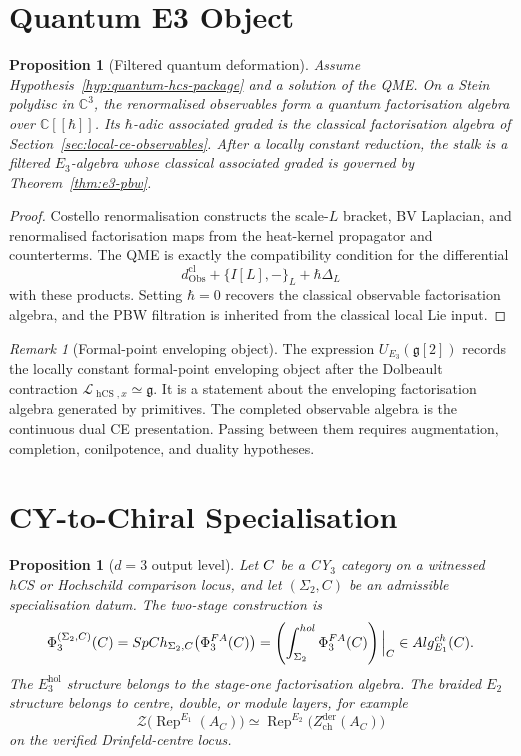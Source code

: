 \documentclass[11pt]{amsart}
\providecommand{\C}{\mathbb{C}}
\providecommand{\fg}{\mathfrak{g}}
\providecommand{\Rep}{\operatorname{Rep}}
\providecommand{\Obs}{\operatorname{Obs}}
\providecommand{\hCS}{\operatorname{hCS}}
\providecommand{\Alg}{\operatorname{Alg}}
\providecommand{\cL}{\mathcal{L}}
\providecommand{\cZ}{\mathcal{Z}}
\providecommand{\Eone}{E_1}
\providecommand{\Etwo}{E_2}
\providecommand{\Ethree}{E_3}
\providecommand{\PhiFA}{\Phi^{\mathrm{FA}}}
\providecommand{\SpCh}{\operatorname{SpCh}}
\providecommand{\Zchder}{Z^{\mathrm{der}}_{\mathrm{ch}}}
\theoremstyle{plain}
\newtheorem{proposition}[theorem]{Proposition}
\theoremstyle{definition}
\theoremstyle{remark}
\newtheorem{remark}[theorem]{Remark}
\begin{document}
\section{Quantum E3 Object}
\label{sec:quantum-e3-object}

\begin{proposition}[Filtered quantum deformation]
\label{prop:filtered-quantum-deformation}
Assume Hypothesis~\ref{hyp:quantum-hcs-package} and a solution of the
QME. On a Stein polydisc in \(\C^3\), the renormalised observables form
a quantum factorisation algebra over \(\C[[\hbar]]\). Its
\(\hbar\)-adic associated graded is the classical factorisation algebra
of Section~\ref{sec:local-ce-observables}. After a locally constant
reduction, the stalk is a filtered \(\Ethree\)-algebra whose classical
associated graded is governed by Theorem~\ref{thm:e3-pbw}.
\end{proposition}

\begin{proof}
Costello renormalisation constructs the scale-\(L\) bracket,
BV Laplacian, and renormalised factorisation maps from the heat-kernel
propagator and counterterms. The QME is exactly the compatibility
condition for the differential
\[
  d_{\Obs}^{\mathrm{cl}}+\{I[L],-\}_L+\hbar\Delta_L
\]
with these products. Setting \(\hbar=0\) recovers the classical
observable factorisation algebra, and the PBW filtration is inherited
from the classical local Lie input.
\end{proof}

\begin{remark}[Formal-point enveloping object]
\label{rem:ue3-records}
The expression \(U_{\Ethree}(\fg[2])\) records the locally constant
formal-point enveloping object after the Dolbeault contraction
\(\cL_{\hCS,x}\simeq\fg\). It is a statement about the enveloping
factorisation algebra generated by primitives. The completed observable
algebra is the continuous dual CE presentation. Passing between them
requires augmentation, completion, conilpotence, and duality hypotheses.
\end{remark}

\section{CY-to-Chiral Specialisation}
\label{sec:cy-to-chiral-specialisation}

\begin{proposition}[\(d=3\) output level]
\label{prop:d3-output-level}
Let \(C\) be a CY\(_3\) category on a witnessed hCS or Hochschild
comparison locus, and let \((\Sigma_2,C)\) be an admissible
specialisation datum. The two-stage construction is
\[
  \Phi_3^{(\Sigma_2,C)}(\cC)
  =
  \SpCh_{\Sigma_2,C}\bigl(\PhiFA_3(\cC)\bigr)
  =
  \left(\int_{\Sigma_2}^{\mathrm{hol}}\PhiFA_3(\cC)\right)\Big|_C
  \in
  \Alg^{\mathrm{ch}}_{\Eone}(C).
\]
The \(\Ethree^{\mathrm{hol}}\) structure belongs to the stage-one
factorisation algebra. The braided \(\Etwo\) structure belongs to
centre, double, or module layers, for example
\[
  \cZ\bigl(\Rep^{\Eone}(A_C)\bigr)
  \simeq
  \Rep^{\Etwo}\bigl(\Zchder(A_C)\bigr)
\]
on the verified Drinfeld-centre locus.
\end{proposition}
\end{document}
